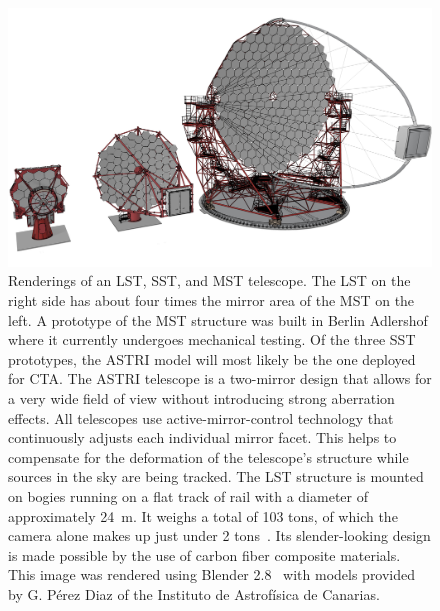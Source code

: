 \begin{figure}
  \centering
  \includegraphics[width=\textwidth]{figures/composite.jpg}
  \caption[Renderings of the individual CTA telescopes]{Renderings of an LST, SST, and MST telescope.
  The LST on the right side has about four times the mirror area of the MST on the left. 
  A prototype of the MST structure was built in Berlin Adlershof where it currently undergoes mechanical testing. 
  Of the three SST prototypes, the ASTRI model will most likely be the one deployed for CTA. 
  The ASTRI telescope is a two-mirror design that allows for a very wide field of view without introducing strong aberration effects.
  All telescopes use active-mirror-control technology that continuously adjusts each individual mirror facet. This helps to compensate 
  for the deformation of the telescope's structure while sources in the sky are being tracked. 
  The LST structure is mounted on bogies running on a flat track of rail with a diameter of approximately \SI{24}{\metre}.
  It weighs a total of 103 tons, of which the camera alone makes up just under 2 tons~\cite{lst_design}. 
  Its slender-looking design is made possible by the use of carbon fiber composite materials.
  This image was rendered using Blender 2.8~\cite{blender} with models provided by G. Pérez Diaz of the Instituto de Astrofísica de Canarias.}
  \label{fig:tel_renders}
\end{figure}

